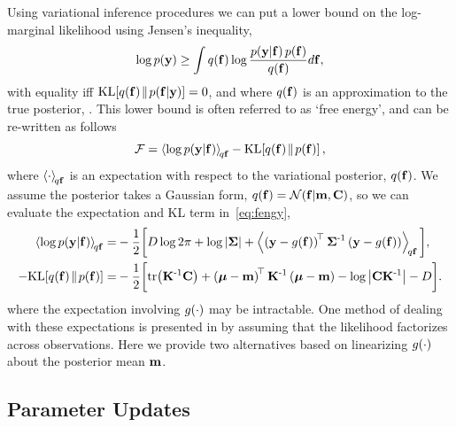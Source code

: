 \documentclass{article} %
\begin{document}
Using variational inference procedures we can put a lower bound on the
log-marginal likelihood using Jensen's inequality, 
\begin{equation}
    \log p\!\left({\mathbf{y}}\right) \geq \int q\!\left({\mathbf{f}}\right) \log 
        \frac{p\!\left({\mathbf{y}}\middle\vert{\ensuremath{\mathbf{f}}}\right)p\!\left({\mathbf{f}}\right)}{q\!\left({\mathbf{f}}\right)} d\mathbf{f},
\end{equation}
with equality iff $\text{KL}\!\left[{{q\!\left({\mathbf{f}}\right)}\!\parallel\!{p\!\left({\mathbf{f}}\middle\vert{\ensuremath{\mathbf{y}}}\right)}}\right] = 0$, and where
$q\!\left({\mathbf{f}}\right)$ is an approximation to the true posterior,
\probC{\lstate}{\obs}. This lower bound is often referred to as `free energy',
and can be re-written as follows
\begin{equation}
    \mathcal{F} = \left\langle{\log \ensuremath{p\!\left({\mathbf{y}}\middle\vert{\ensuremath{\mathbf{f}}}\right)}}\right\rangle_{\!{q\mathbf{f}}}
        - \text{KL}\!\left[{{q\!\left({\mathbf{f}}\right)}\!\parallel\!{p\!\left({\mathbf{f}}\right)}}\right],
    \label{eq:fengy}
\end{equation}
where $\left\langle{\cdot}\right\rangle_{\!{q\mathbf{f}}}$ is an expectation with respect to the
variational posterior, $q\!\left({\mathbf{f}}\right)$. We assume the posterior takes a
Gaussian form, $q\!\left({\mathbf{f}}\right) = \mathcal{N}\!\left({\mathbf{f}}\middle\vert{\ensuremath{\mathbf{m}}, \ensuremath{\mathbf{C}}}\right)$, so
we can evaluate the expectation and KL term in~\eqref{eq:fengy},
\begin{align}
    \expec{q\lstate}{\log \probC{\obs}{\lstate}}
        =& - \frac{1}{2} \bigg[ 
            D\log{2\pi} + \log\deter{\lcov} 
            + \expec{q\lstate}{\brac{\obs - \nonlin{\lstate}}\transpose\lcov\inv
            \brac{\obs - \nonlin{\lstate}}}\bigg],
            \label{eq:qlike} \\
     - \KL{\qrob{\lstate}}{\prob{\lstate}}
        =& - \frac{1}{2} \bigg[\trace{\prcov\inv\pocov}
        + \brac{\prmean - \pomean}\transpose\prcov\inv
        \brac{\prmean - \pomean} 
        - \log \deter{\pocov\prcov\inv}
        - D\bigg] \label{eq:qkl}.
\end{align}
where the expectation involving $g\!\left({{\cdot}}\right)$ may be intractable. One method
of dealing with these expectations is presented in \cite{Opper2009} by assuming
that the likelihood factorizes across observations. Here we provide two
alternatives based on linearizing $g\!\left({{\cdot}}\right)$ about  the posterior mean
$\mathbf{m}$.


\subsection{Parameter Updates}
\end{document}
